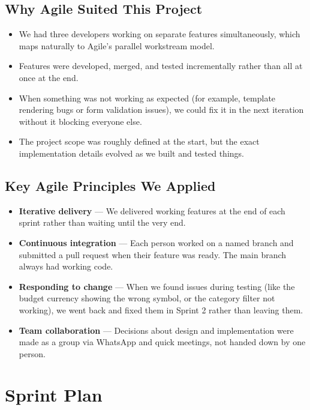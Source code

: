 \documentclass[12pt,a4paper]{report}
\begin{document}
\subsection{Why Agile Suited This Project}

\begin{itemize}
  \item We had three developers working on separate features simultaneously, which maps naturally to Agile's parallel workstream model.
  \item Features were developed, merged, and tested incrementally rather than all at once at the end.
  \item When something was not working as expected (for example, template rendering bugs or form validation issues), we could fix it in the next iteration without it blocking everyone else.
  \item The project scope was roughly defined at the start, but the exact implementation details evolved as we built and tested things.
\end{itemize}

\subsection{Key Agile Principles We Applied}

\begin{itemize}
  \item \textbf{Iterative delivery} --- We delivered working features at the end of each sprint rather than waiting until the very end.
  \item \textbf{Continuous integration} --- Each person worked on a named branch and submitted a pull request when their feature was ready. The main branch always had working code.
  \item \textbf{Responding to change} --- When we found issues during testing (like the budget currency showing the wrong symbol, or the category filter not working), we went back and fixed them in Sprint 2 rather than leaving them.
  \item \textbf{Team collaboration} --- Decisions about design and implementation were made as a group via WhatsApp and quick meetings, not handed down by one person.
\end{itemize}

\section{Sprint Plan}
\end{document}
